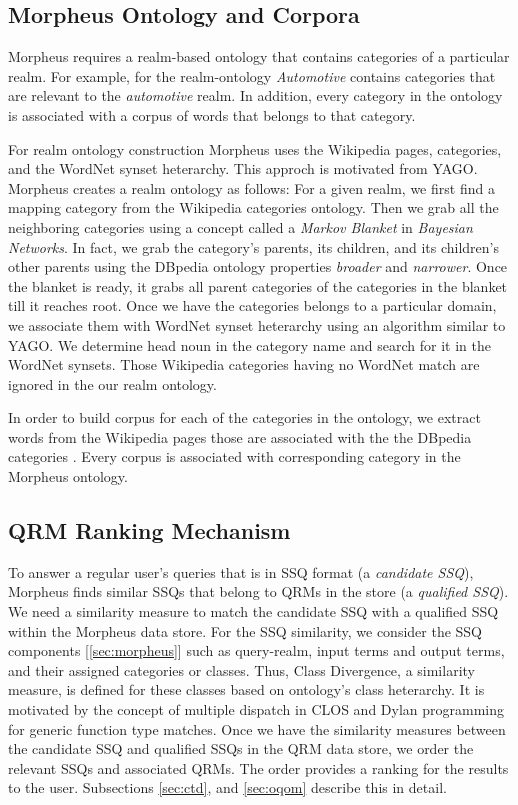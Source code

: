\subsection{Morpheus Ontology and Corpora} 

Morpheus requires a realm-based ontology that contains categories of a
particular realm. For example, for the realm-ontology \textit{Automotive}
contains categories that are relevant to the \textit{automotive} realm. In
addition, every category in the ontology is associated with a corpus of words
that belongs to that category.   

For realm ontology construction Morpheus uses the Wikipedia pages, categories, and the WordNet synset heterarchy. This approch is motivated from YAGO\cite{Suchanek2009phd}. Morpheus creates a realm ontology as follows: For a given realm, we first find a mapping category from the Wikipedia categories  ontology. Then we grab all the neighboring categories
using a concept called a \textit{Markov Blanket} \cite{PRIS} in \textit{Bayesian
Networks}. In fact, we grab the category's parents, its children, and its 
children's other parents using the DBpedia ontology properties \textit{broader}
and \textit{narrower}. Once the blanket is ready, it grabs all parent categories
of the categories in the blanket till it reaches root. Once we have the categories belongs to a particular domain, we associate them with WordNet synset heterarchy using an algorithm similar to YAGO. We determine head noun in the category name and search for it in the WordNet synsets\cite{Suchanek2009phd}. Those Wikipedia categories having no WordNet match are ignored in the our realm ontology.   

In order to build corpus for each of the categories in the ontology, 
we extract words from the Wikipedia pages those are associated with the 
the DBpedia categories \cite{Auer07dbpedia:a}. Every corpus is associated 
with corresponding category in the Morpheus ontology.  

\subsection{QRM Ranking Mechanism} 

To answer a regular user's queries that is in SSQ format (a \textit{candidate
SSQ}), Morpheus finds similar SSQs that belong to QRMs in the store (a
\textit{qualified SSQ}). We need a similarity measure to match the candidate SSQ with a qualified SSQ within the Morpheus data store. For the SSQ similarity, we consider the SSQ components [\ref{sec:morpheus}] such as query-realm, input terms and output terms, and their assigned categories or classes. Thus, Class Divergence, a similarity measure, is defined for these classes based on ontology's class heterarchy. It is motivated by the concept of multiple dispatch in CLOS \cite{Steele1990} and Dylan programming \cite{Barrett1996} for generic function type matches. Once we have the similarity measures between the candidate SSQ and qualified SSQs in the QRM data store, we order the relevant SSQs and associated QRMs. The order provides a ranking for the results to the user. Subsections \ref{sec:ctd}, and \ref{sec:oqom} describe this in detail.

